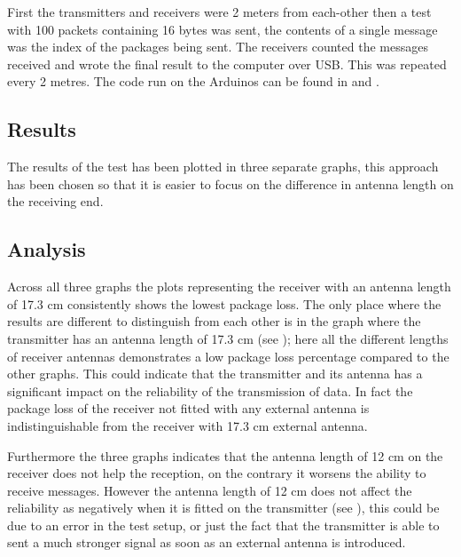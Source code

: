 First the transmitters and receivers were 2 meters from each-other then a test with 100 packets containing 16 bytes was sent, the contents of a single message was the index of the packages being sent. 
The receivers counted the messages received and wrote the final result to the computer over USB. 
This was repeated every 2 metres. 
The code run on the Arduinos can be found in  and .

\subsection{Results}
The results of the test has been plotted in three separate graphs, this approach has been chosen so that it is easier to focus on the difference in antenna length on the receiving end.

\subsection{Analysis}
Across all three graphs the plots representing the receiver with an antenna length of 17.3 cm consistently shows the lowest package loss. 
The only place where the results are different to distinguish from each other is in the graph where the transmitter has an antenna length of 17.3 cm (see ); here all the different lengths of receiver antennas demonstrates a low package loss percentage compared to the other graphs.
This could indicate that the transmitter and its antenna has a significant impact on the reliability of the transmission of data.
In fact the package loss of the receiver not fitted with any external antenna is indistinguishable from the receiver with 17.3 cm external antenna.

Furthermore the three graphs indicates that the antenna length of 12 cm on the receiver does not help the reception, on the contrary it worsens the ability to receive messages.
However the antenna length of 12 cm does not affect the reliability as negatively when it is fitted on the transmitter (see ), this could be due to an error in the test setup, or just the fact that the transmitter is able to sent a much stronger signal as soon as an external antenna is introduced.

